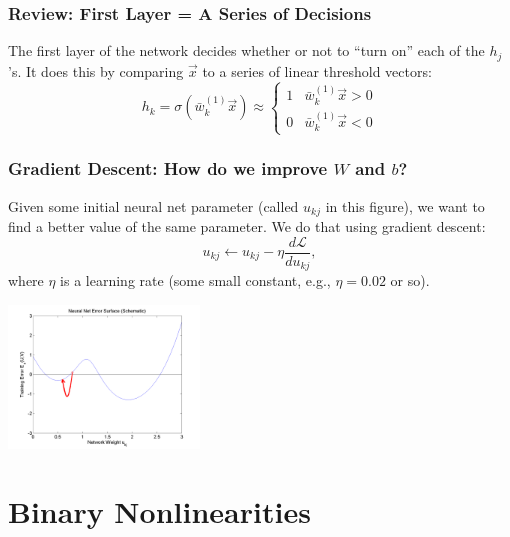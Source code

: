 \documentclass{beamer}
\begin{document}
\begin{frame}
  \frametitle{Review: First Layer = A Series of Decisions}

  The first layer of the network decides whether or not to ``turn on'' each of the
  $h_j$'s.  It does this by comparing $\vec{x}$ to a series of linear threshold vectors:
  \[
  h_k = \sigma\left(\bar{w}_k^{(1)}\vec{x}\right)\approx\begin{cases}
  1 & \bar{w}_k^{(1)}\vec{x} > 0\\
  0 & \bar{w}_k^{(1)}\vec{x} < 0
  \end{cases}
  \]
\end{frame}

\begin{frame}
  \frametitle{Gradient Descent: How do we improve $W$ and $b$?}  Given
  some initial neural net parameter (called $u_{kj}$ in this figure),
  we want to find a better value of the same parameter.  We do that
  using gradient descent:
  \[
  u_{kj} \leftarrow u_{kj}-\eta\frac{d{\mathcal L}}{du_{kj}},
  \]
  where $\eta$ is a learning rate (some small constant, e.g., $\eta=0.02$ or so).
  \centerline{\includegraphics[width=2in]{../lec07/figs/nn_errorsurf1.png}}
\end{frame}

\section{Binary Nonlinearities}
\setcounter{subsection}{1}
\end{document}
